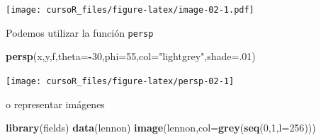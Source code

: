 \documentclass[]{book}
\newenvironment{Shaded}{\begin{snugshade}}{\end{snugshade}}
\newcommand{\KeywordTok}[1]{\textcolor[rgb]{0.13,0.29,0.53}{\textbf{#1}}}
\newcommand{\DataTypeTok}[1]{\textcolor[rgb]{0.13,0.29,0.53}{#1}}
\newcommand{\DecValTok}[1]{\textcolor[rgb]{0.00,0.00,0.81}{#1}}
\newcommand{\StringTok}[1]{\textcolor[rgb]{0.31,0.60,0.02}{#1}}
\newcommand{\OtherTok}[1]{\textcolor[rgb]{0.56,0.35,0.01}{#1}}
\newcommand{\OperatorTok}[1]{\textcolor[rgb]{0.81,0.36,0.00}{\textbf{#1}}}
\newcommand{\NormalTok}[1]{#1}
\begin{document}
\begin{Shaded}
\end{Shaded}

\texttt{[image: cursoR\_files/figure-latex/image-02-1.pdf]}

Podemos utilizar la función \texttt{persp}

\begin{Shaded}
\begin{Highlighting}[]
\KeywordTok{persp}\NormalTok{(x,y,f,}\DataTypeTok{theta=}\OperatorTok{-}\DecValTok{30}\NormalTok{,}\DataTypeTok{phi=}\DecValTok{55}\NormalTok{,}\DataTypeTok{col=}\StringTok{"lightgrey"}\NormalTok{,}\DataTypeTok{shade=}\NormalTok{.}\DecValTok{01}\NormalTok{)}
\end{Highlighting}
\end{Shaded}

\begin{center}\texttt{[image: cursoR\_files/figure-latex/persp-02-1]} \end{center}

o representar imágenes

\begin{Shaded}
\begin{Highlighting}[]
\KeywordTok{library}\NormalTok{(fields)}
\KeywordTok{data}\NormalTok{(lennon)}
\KeywordTok{image}\NormalTok{(lennon,}\DataTypeTok{col=}\KeywordTok{grey}\NormalTok{(}\KeywordTok{seq}\NormalTok{(}\DecValTok{0}\NormalTok{,}\DecValTok{1}\NormalTok{,}\DataTypeTok{l=}\DecValTok{256}\NormalTok{)))}
\end{Highlighting}
\end{Shaded}
\end{document}
